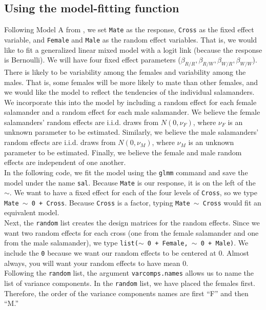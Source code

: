 \documentclass[article]{jss}
\begin{document}
\subsection{Using the model-fitting function}

  Following Model A from \citet{karim:zeger:1992}, we set \texttt{Mate} as the response, \texttt{Cross} as the fixed effect variable, and \texttt{Female} and \texttt{Male} as the random effect variables. That is, we would like to fit a generalized linear mixed model with a logit link (because the response is Bernoulli). We will have four fixed effect parameters ($\beta_{R/R}, \beta_{R/W},\beta_{W/R},\beta_{W/W}$). There is likely to be variability among the females and variability among the males. That is, some females will be more likely to mate than other females, and we would like the model to reflect the tendencies of the individual salamanders. We incorporate this into the model by including a random effect for each female salamander and a random effect for each male salamander. We believe the female salamanders' random effects are i.i.d. draws from $N(0, \nu_F)$, where $\nu_F$ is an unknown parameter to be estimated. Similarly, we believe the male salamanders' random effects are i.i.d. draws from $N(0,\nu_M)$, where $\nu_M$ is an unknown parameter to be estimated. Finally, we believe the female and male random effects are independent of one another. \\




In the following code, we  fit the model using the \texttt{glmm} command and save the model under the name  \texttt{sal}. Because \texttt{Mate} is our response, it is on the left of the $\sim$. We want to have a fixed effect for each of the four levels of \texttt{Cross}, so we type \texttt{Mate $\sim$ 0 + Cross}. Because \texttt{Cross} is a factor, typing \texttt{Mate $\sim$ Cross} would fit an equivalent model. \\ 

Next, the \texttt{random} list creates the design matrices for the random effects. Since we want two random effects for each cross (one from the female salamander and one from the male salamander), we type \texttt{list($\sim$ 0 + Female, $\sim$ 0 + Male)}. We  include the \texttt{0} because we want our random effects to be centered at 0. Almost always, you will want your random effects to have mean 0. \\

 Following the \texttt{random} list, the argument \texttt{varcomps.names} allows us to name the list of variance components. In the \texttt{random} list, we have placed the females first. Therefore, the order of the variance components names are first ``F'' and then ``M.''  \\
\end{document}
